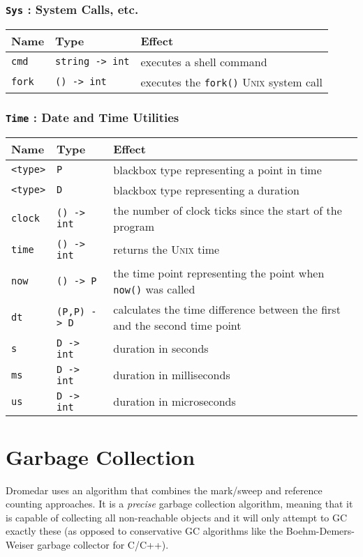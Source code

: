 \documentclass{article}
\newcommand{\code}[1]{\lstinline[columns=fixed]{#1}}
\begin{document}
			\subsubsection{\code{Sys} : System Calls, etc.}
			
				\begin{longtable}{l|l|l}
					\textbf{Name} & \textbf{Type} & \textbf{Effect} \\
					\midrule
					\code{cmd} & \code{string -> int} & executes a shell command \\
					\code{fork} & \code{() -> int} & executes the \code{fork()} \textsc{Unix} system call
				\end{longtable}
			
			\subsubsection{\code{Time} : Date and Time Utilities}
			
				\begin{longtable}{l|l|l}
					\textbf{Name} & \textbf{Type} & \textbf{Effect} \\
					\midrule
					\code{<type>} & \code{P} & blackbox type representing a point in time \\
					\code{<type>} & \code{D} & blackbox type representing a duration \\
					\code{clock} & \code{() -> int} & the number of clock ticks since the start of the program \\
					\code{time} & \code{() -> int} & returns the \textsc{Unix} time \\
					\code{now} & \code{() -> P} & the time point representing the point when \code{now()} was called \\
					\code{dt} & \code{(P,P) -> D} & calculates the time difference between the first and the second time point \\
					\code{s} & \code{D -> int} & duration in seconds \\
					\code{ms} & \code{D -> int} & duration in milliseconds \\
					\code{us} & \code{D -> int} & duration in microseconds
				\end{longtable}
		
	\section{Garbage Collection}
	
		Dromedar uses an algorithm that combines the mark/sweep and reference counting approaches. It is a \textit{precise} garbage collection algorithm, meaning that it is capable of collecting all non-reachable objects and it will only attempt to GC exactly these (as opposed to conservative GC algorithms like the Boehm-Demers-Weiser garbage collector for C/C++).
		
\end{document}

